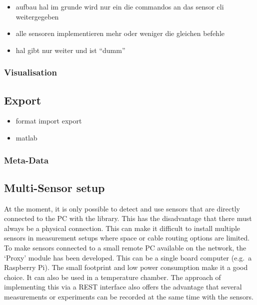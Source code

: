 \begin{itemize}
\tightlist
\item
  aufbau hal im grunde wird nur ein die commandos an das sensor cli
  weitergegeben
\item
  alle sensoren implementieren mehr oder weniger die gleichen befehle
\item
  hal gibt nur weiter und ist ``dumm''
\end{itemize}

\hypertarget{visualisation}{%
\subsubsection{Visualisation}\label{visualisation}}

\hypertarget{export}{%
\subsection{Export}\label{export}}

\begin{itemize}
\tightlist
\item
  format import export
\item
  matlab
\end{itemize}

\hypertarget{meta-data}{%
\subsubsection{Meta-Data}\label{meta-data}}

\hypertarget{multi-sensor-setup}{%
\subsection{Multi-Sensor setup}\label{multi-sensor-setup}}

At the moment, it is only possible to detect and use sensors that are
directly connected to the PC with the library. This has the disadvantage
that there must always be a physical connection. This can make it
difficult to install multiple sensors in measurement setups where space
or cable routing options are limited. To make sensors connected to a
small remote PC available on the network, the `Proxy' module has been
developed. This can be a single board computer (e.g.~a Raspberry Pi).
The small footprint and low power consumption make it a good choice. It
can also be used in a temperature chamber. The approach of implementing
this via a REST interface also offers the advantage that several
measurements or experiments can be recorded at the same time with the
sensors.

